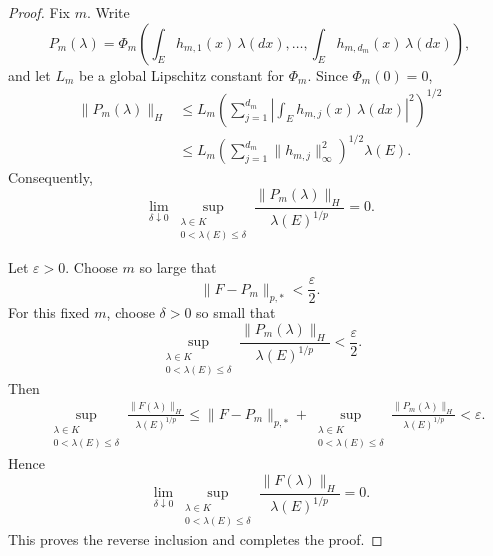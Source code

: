 \documentclass[a4paper,10pt]{article}
\begin{document}
\begin{proof}
Fix \(m\). Write
\[
P_m(\lambda)
=
\Phi_m
\left(
        \int_E h_{m,1}(x)\,\lambda(dx),
        \ldots,
        \int_E h_{m,d_m}(x)\,\lambda(dx)
\right),
\]
and let \(L_m\) be a global Lipschitz constant for \(\Phi_m\).
Since \(\Phi_m(0)=0\),
\[
\begin{aligned}
\lVert P_m(\lambda)\rVert_H
&\le
L_m
\left(
\sum_{j=1}^{d_m}
\left|
\int_Eh_{m,j}(x)\,\lambda(dx)
\right|^2
\right)^{1/2}
\\
&\le
L_m
\left(
\sum_{j=1}^{d_m}
\lVert h_{m,j}\rVert_\infty^2
\right)^{1/2}
\lambda(E).
\end{aligned}
\]
Consequently,
\[
\lim_{\delta\downarrow0}
\sup_{\substack{\lambda\in K\\
                 0<\lambda(E)\le\delta}}
\frac{\lVert P_m(\lambda)\rVert_H}
     {\lambda(E)^{1/p}}
=
0.
\]

Let \(\varepsilon>0\). Choose \(m\) so large that
\[
        \lVert F-P_m\rVert_{p,*}
        <
        \frac{\varepsilon}{2}.
\]
For this fixed \(m\), choose \(\delta>0\) so small that
\[
\sup_{\substack{\lambda\in K\\
                 0<\lambda(E)\le\delta}}
\frac{\lVert P_m(\lambda)\rVert_H}
     {\lambda(E)^{1/p}}
<
\frac{\varepsilon}{2}.
\]
Then
\[
\begin{aligned}
&
\sup_{\substack{\lambda\in K\\
                 0<\lambda(E)\le\delta}}
\frac{\lVert F(\lambda)\rVert_H}
     {\lambda(E)^{1/p}}
\le
\lVert F-P_m\rVert_{p,*}
+
\sup_{\substack{\lambda\in K\\
                 0<\lambda(E)\le\delta}}
\frac{\lVert P_m(\lambda)\rVert_H}
     {\lambda(E)^{1/p}}
<
\varepsilon.
\end{aligned}
\]
Hence
\[
\lim_{\delta\downarrow0}
\sup_{\substack{\lambda\in K\\
                 0<\lambda(E)\le\delta}}
\frac{\lVert F(\lambda)\rVert_H}
     {\lambda(E)^{1/p}}
=
0.
\]
This proves the reverse inclusion and completes the proof.
\end{proof}
\end{document}
